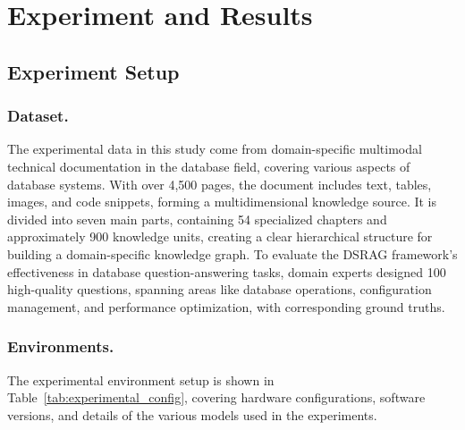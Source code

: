 \documentclass[runningheads]{llncs}
\begin{document}
 \section{Experiment and Results}\label{Work4}
	\subsection{Experiment Setup}
	\subsubsection{Dataset.} The experimental data in this study come from domain-specific multimodal technical documentation in the database field, covering various aspects of database systems. With over 4,500 pages, the document includes text, tables, images, and code snippets, forming a multidimensional knowledge source. It is divided into seven main parts, containing 54 specialized chapters and approximately 900 knowledge units, creating a clear hierarchical structure for building a domain-specific knowledge graph. To evaluate the DSRAG framework's effectiveness in database question-answering tasks, domain experts designed 100 high-quality questions, spanning areas like database operations, configuration management, and performance optimization, with corresponding ground truths.

 \subsubsection{Environments.} The experimental environment setup is shown in Table~\ref{tab:experimental_config}, covering hardware configurations, software versions, and details of the various models used in the experiments.

\begin{table}[H]
\centering
\small %
\caption{Experimental Configuration Details}\label{tab:experimental_config}
\end{table}
\end{document}

